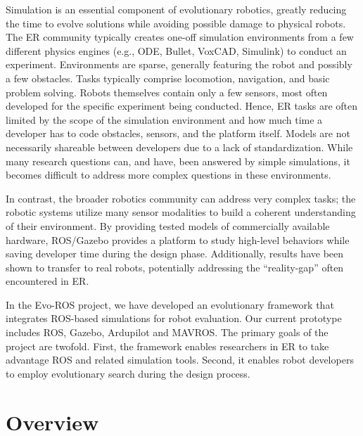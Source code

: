\documentclass{report}
\begin{document}
Simulation is an essential component of evolutionary robotics, greatly reducing the time to evolve solutions while avoiding possible damage to physical robots. The ER community typically creates one-off simulation environments from a few different physics engines (e.g., ODE, Bullet, VoxCAD, Simulink) to conduct an experiment. Environments are sparse, generally featuring the robot and possibly a few obstacles. Tasks typically
comprise locomotion, navigation, and basic problem solving. Robots themselves contain only a few sensors, most often developed for the specific experiment being conducted. Hence, ER tasks are often limited by the scope of the simulation environment and how much time a developer has to code obstacles, sensors, and the platform itself. Models are not necessarily shareable between developers due to a lack of standardization. While many research questions can, and have, been answered by simple simulations, it becomes difficult to address more complex questions in these environments.

In contrast, the broader robotics community can address very complex tasks; the robotic systems utilize many sensor modalities to build a coherent understanding of their environment. By providing tested models of commercially available hardware, ROS/Gazebo provides a platform to study high-level behaviors while saving developer time during the design phase. Additionally, results have been shown to transfer to real robots,
potentially addressing the “reality-gap” often encountered in ER.

In the Evo-ROS project, we have developed an evolutionary framework that integrates ROS-based simulations for robot evaluation. Our current prototype includes ROS, Gazebo, Ardupilot and MAVROS. The primary goals of the project are twofold. First, the framework enables researchers in ER to take advantage ROS and related simulation tools. Second, it enables robot developers to employ evolutionary search during the design
process.






\iffalse
\section{Overview}
\end{document}
